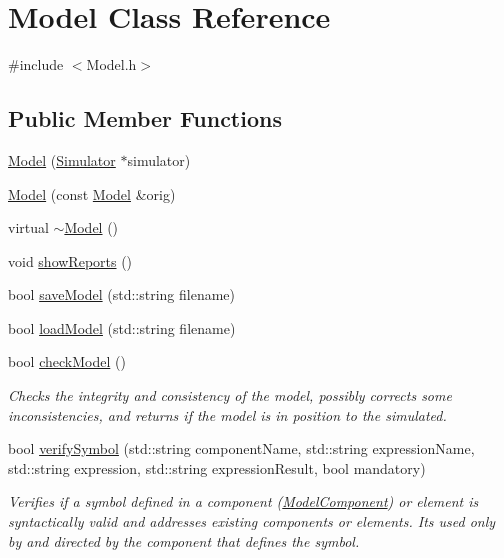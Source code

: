 \hypertarget{class_model}{}\section{Model Class Reference}
\label{class_model}


{\ttfamily \#include $<$Model.\+h$>$}

\subsection*{Public Member Functions}
\begin{DoxyCompactItemize}
\item 
\hyperlink{class_model_ae86e1403523e8036ba6366d1967ecac0}{Model} (\hyperlink{class_simulator}{Simulator} $\ast$simulator)
\item 
\hyperlink{class_model_afdedf278781f785abeecf5f450e43653}{Model} (const \hyperlink{class_model}{Model} \&orig)
\item 
virtual \hyperlink{class_model_ad6ebd2062a0b823db841a0b88baac4c0}{$\sim$\+Model} ()
\item 
void \hyperlink{class_model_a44c66f552308e7a6a5701801186a8637}{show\+Reports} ()
\item 
bool \hyperlink{class_model_ae099910781f5267a51fb5d607246af4a}{save\+Model} (std\+::string filename)
\item 
bool \hyperlink{class_model_aba57e8b62d4dcc3ac8e3037933fa6f04}{load\+Model} (std\+::string filename)
\item 
bool \hyperlink{class_model_ae3b293adffbef6fd254d661ceeb2e116}{check\+Model} ()
\begin{DoxyCompactList}\small\item\em Checks the integrity and consistency of the model, possibly corrects some inconsistencies, and returns if the model is in position to the simulated. \end{DoxyCompactList}\item 
bool \hyperlink{class_model_ae2be8579f8519eec5da9e6f72c7ec361}{verify\+Symbol} (std\+::string component\+Name, std\+::string expression\+Name, std\+::string expression, std\+::string expression\+Result, bool mandatory)
\begin{DoxyCompactList}\small\item\em Verifies if a symbol defined in a component (\hyperlink{class_model_component}{Model\+Component}) or element is syntactically valid and addresses existing components or elements. It\textquotesingle{}s used only by and directed by the component that defines the symbol. \end{DoxyCompactList}\item 

\end{DoxyCompactItemize}

